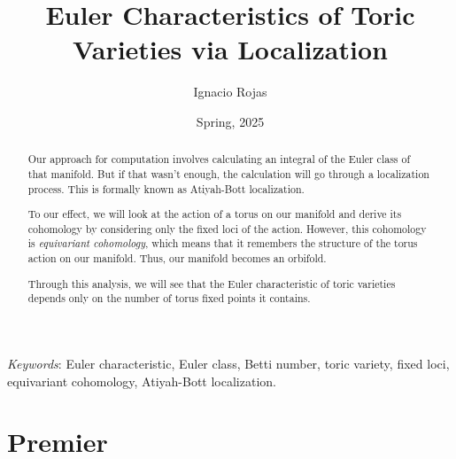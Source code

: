 \documentclass[12pt]{memoir}
\title{Euler Characteristics of Toric Varieties via Localization}
\author{Ignacio Rojas}
\date{Spring, 2025}
\begin{document}
\bgroup
\renewcommand\thesection{\arabic{section}}
\renewcommand{\thefigure}{\arabic{figure}}
\maketitle
\iffalse
\begin{abstract}
    Our approach for computation involves calculating an integral of the Euler class of that manifold. But if that wasn't enough, the calculation will go through a localization process. This is formally known as Atiyah-Bott localization.\par
    To our effect, we will look at the action of a torus on our manifold and derive its cohomology by considering only the fixed loci of the action. However, this cohomology is \emph{equivariant cohomology}, which means that it remembers the structure of the torus action on our manifold. Thus, our manifold becomes an orbifold.\par
    Through this analysis, we will see that the Euler characteristic of toric varieties depends only on the number of torus fixed points it contains.
    \end{abstract}
    
    \begin{flushleft}
    \small
    \emph{Keywords}:
    Euler characteristic, Euler class, Betti number, toric variety, fixed loci, equivariant cohomology, Atiyah-Bott localization.
    
    \end{flushleft}
    \section{Premier}
\end{document}
